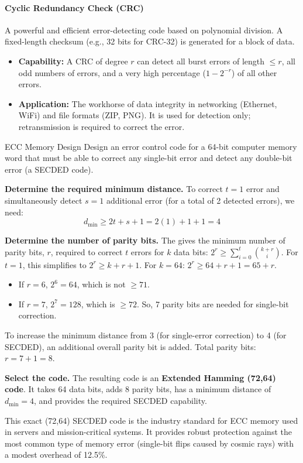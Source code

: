 \paragraph{Cyclic Redundancy Check (CRC)}
A powerful and efficient error-detecting code based on polynomial division. A fixed-length checksum (e.g., 32 bits for CRC-32) is generated for a block of data.
\begin{itemize}
    \item \textbf{Capability:} A CRC of degree $r$ can detect all burst errors of length $\le r$, all odd numbers of errors, and a very high percentage ($1-2^{-r}$) of all other errors.
    \item \textbf{Application:} The workhorse of data integrity in networking (Ethernet, WiFi) and file formats (ZIP, PNG). It is used for detection only; retransmission is required to correct the error.
\end{itemize}


\begin{workedexample}{ECC Memory Design}
     Design an error control code for a 64-bit computer memory word that must be able to correct any single-bit error and detect any double-bit error (a SECDED code).
    
    \begin{derivationsteps}
        \step \textbf{Determine the required minimum distance.} To correct $t=1$ error and simultaneously detect $s=1$ additional error (for a total of 2 detected errors), we need:
        \[ d_{\min} \ge 2t + s + 1 = 2(1) + 1 + 1 = 4 \]
        
        \step \textbf{Determine the number of parity bits.} The  gives the minimum number of parity bits, $r$, required to correct $t$ errors for $k$ data bits: $2^r \ge \sum_{i=0}^{t} \binom{k+r}{i}$. For $t=1$, this simplifies to $2^r \ge k+r+1$.
        For $k=64$: $2^r \ge 64+r+1 = 65+r$.
        \begin{itemize}
            \item If $r=6$, $2^6 = 64$, which is not $\ge 71$.
            \item If $r=7$, $2^7 = 128$, which is $\ge 72$. So, 7 parity bits are needed for single-bit correction.
        \end{itemize}
        To increase the minimum distance from 3 (for single-error correction) to 4 (for SECDED), an additional overall parity bit is added.
        Total parity bits: $r = 7 + 1 = 8$.

        \step \textbf{Select the code.} The resulting code is an \textbf{Extended Hamming (72,64) code}. It takes 64 data bits, adds 8 parity bits, has a minimum distance of $d_{\min}=4$, and provides the required SECDED capability.
    \end{derivationsteps}
    
     This exact (72,64) SECDED code is the industry standard for ECC memory used in servers and mission-critical systems. It provides robust protection against the most common type of memory error (single-bit flips caused by cosmic rays) with a modest overhead of 12.5\%.
\end{workedexample}


